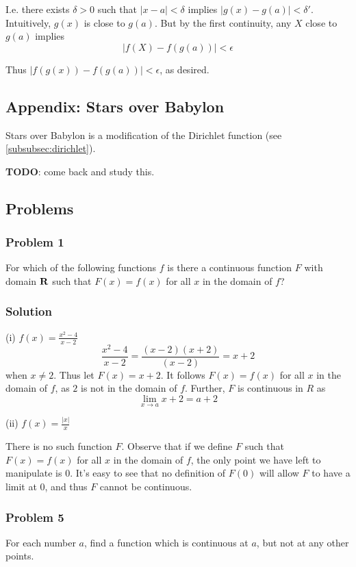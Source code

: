 \vs

I.e. there exists $\delta>0$ such that $|x-a|<\delta$ implies
$|g(x)-g(a)|<\delta'$. Intuitively, $g(x)$ is close to $g(a)$. But by the
first continuity, any $X$ close to $g(a)$ implies
\[|f(X)-f(g(a))|<\epsilon\]

Thus $|f(g(x))-f(g(a))|<\epsilon$, as desired.

\subsection{Appendix: Stars over Babylon}
Stars over Babylon is a modification of the Dirichlet function (see
\ref{subsubsec:dirichlet}).

\vs

\textbf{TODO}: come back and study this.

\subsection{Problems}

\subsubsection*{Problem 1}
For which of the following functions $f$ is there a continuous function $F$ with domain $\mathbf{R}$ such that $F(x)=f(x)$ for all $x$ in the domain of $f$?

\subsubsection*{Solution}
(i) $f(x)=\frac{x^2-4}{x-2}$
\[\frac{x^2-4}{x-2}=\frac{(x-2)(x+2)}{(x-2)}=x+2\]
when $x\neq 2$. Thus let $F(x)=x+2$. It follows $F(x)=f(x)$ for all $x$ in the domain of $f$, as $2$ is not in the domain of $f$. Further, $F$ is continuous in $R$ as
\[\lim_{x\to a}x+2=a+2\]

(ii) $f(x)=\frac{|x|}{x}$

There is no such function $F$. Observe that if we define $F$ such that $F(x)=f(x)$ for all $x$ in the domain of $f$, the only point we have left to manipulate is $0$. It's easy to see that no definition of $F(0)$ will allow $F$ to have a limit at $0$, and thus $F$ cannot be continuous.

\subsubsection*{Problem 5}
For each number $a$, find a function which is continuous at $a$, but not at any other points.


